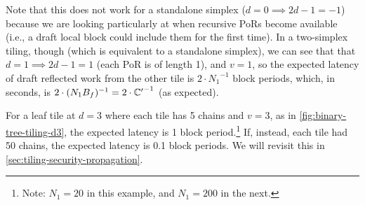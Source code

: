 Note that this does not work for a standalone simplex ($d=0 \implies 2d-1 = -1$) because we are looking particularly at when recursive PoRs become available (i.e., a draft local block could include them for the first time).
In a two-simplex tiling, though (which is equivalent to a standalone simplex), we can see that that $d=1 \implies 2d-1 = 1$ (each PoR is of length 1), and $v=1$, so the expected latency of draft reflected work from the other tile is $2 \cdot {N_1}^{-1}$ block periods, which, in seconds, is $2 \cdot (N_1 B_f)^{-1} = 2 \cdot {\ensuremath{\mathbb{C}^\prime}}^{-1}$ (as expected).

For a leaf tile at $d=3$ where each tile has 5 chains and $v=3$, as in \autoref{fig:binary-tree-tiling-d3}, the expected latency is 1 block period.\footnote{
    Note: $N_1 = 20$ in this example, and $N_1 = 200$ in the next.
}
If, instead, each tile had 50 chains, the expected latency is 0.1 block periods.
We will revisit this in \autoref{sec:tiling-security-propagation}.

